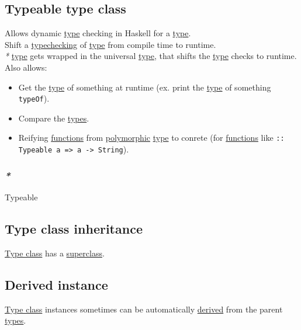 \documentclass[a4paper,14pt,oneside]{book}
\begin{document}
\subsection{\label{org4e2ba82}Typeable type class}
\label{sec:org46a521a}
Allows dynamic \hyperref[orga286a54]{type} checking in Haskell for a \hyperref[orga286a54]{type}.\\
Shift a \hyperref[orgce8277e]{typechecking} of \hyperref[orga286a54]{type} from compile time to runtime.\\
\emph{*} \hyperref[orga286a54]{type} gets wrapped in the universal \hyperref[orga286a54]{type}, that shifts the \hyperref[orga286a54]{type} checks to runtime.\\

Also allows:\\
\begin{itemize}
\item Get the \hyperref[orga286a54]{type} of something at runtime (ex. print the \hyperref[orga286a54]{type} of something \texttt{typeOf}).\\
\item Compare the \hyperref[orga478d03]{types}.\\
\item Reifying \hyperref[org97ed87c]{functions} from \hyperref[orgbdbf338]{polymorphic} \hyperref[orga286a54]{type} to conrete (for \hyperref[org97ed87c]{functions} like \texttt{:: Typeable a => a -> String}).\\
\end{itemize}

\subsubsection{\emph{*}}
\label{sec:orgf5dda0c}

\label{org2e04f1b}Typeable\\

\subsection{\label{orgfe6eb07}Type class inheritance}
\label{sec:org5e22f28}
\hyperref[orga93281c]{Type class} has a \hyperref[org3b07ca3]{superclass}.\\

\subsection{\label{orgbc042d2}Derived instance}
\label{sec:org98fdd9f}
\hyperref[orga93281c]{Type class} instances sometimes can be automatically \hyperref[org574f51c]{derived} from the parent \hyperref[orga478d03]{types}.\\
\end{document}
